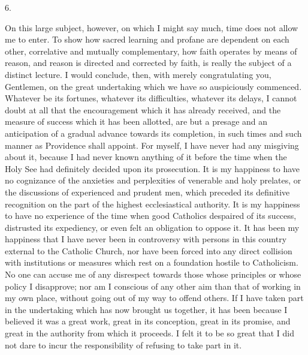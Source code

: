 6.

On this large subject, however, on which I might say much, time
does not allow me to enter. To show how sacred learning and profane
are dependent on each other, correlative and mutually complementary,
how faith operates by means of reason, and reason is directed and
corrected by faith, is really the subject of a distinct lecture. I
would conclude, then, with merely congratulating you, Gentlemen,
on the great undertaking which we have so auspiciously commenced.
Whatever be its fortunes, whatever its difficulties, whatever its
delays, I cannot doubt at all that the encouragement which it has
already received, and the measure of success which it has been
allotted, are but a presage and an anticipation of a gradual advance
towards its completion, in such times and such manner as Providence
shall appoint. For myself, I have never had any misgiving about it,
because I had never known anything of it before the time when the Holy
See had definitely decided upon its prosecution. It is my happiness to
have no cognizance of the anxieties and perplexities of venerable and
holy prelates, or the discussions of experienced and prudent men,
which preceded its definitive recognition on the part of the highest
ecclesiastical authority. It is my happiness to have no experience of
the time when good Catholics despaired of its success, distrusted its
expediency, or even felt an obligation to oppose it. It has been my
happiness that I have never been in controversy with persons in this
country external to the Catholic Church, nor have been forced into any
direct collision with institutions or measures which rest on a
foundation hostile to Catholicism. No one can accuse me of any
disrespect towards those whose principles or whose policy I
disapprove; nor am I conscious of any other aim than that of working
in my own place, without going out of my way to offend others. If I
have taken part in the undertaking which has now brought us together,
it has been because I believed it was a great work, great in its
conception, great in its promise, and great in the authority from
which it proceeds. I felt it to be so great that I did not dare to
incur the responsibility of refusing to take part in it.

